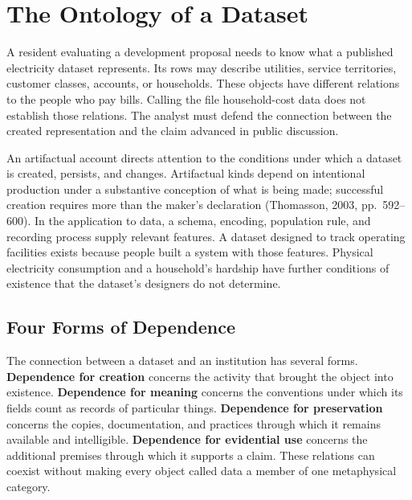 
\hypertarget{M09-the-ontology-of-a-dataset}{%
\section{The Ontology of a
Dataset}\label{M09-the-ontology-of-a-dataset}}

\noindent A resident evaluating a development proposal needs to know what a
published electricity dataset represents. Its rows may describe
utilities, service territories, customer classes, accounts, or
households. These objects have different relations to the people who pay
bills. Calling the file household-cost data does not establish those
relations. The analyst must defend the connection between the created
representation and the claim advanced in public discussion.

An artifactual account directs attention to the conditions under which a
dataset is created, persists, and changes. Artifactual kinds depend on
intentional production under a substantive conception of what is being
made; successful creation requires more than the maker's declaration
(Thomasson, 2003, pp.~592--600). In the application to data, a schema,
encoding, population rule, and recording process supply relevant
features. A dataset designed to track operating facilities exists
because people built a system with those features. Physical electricity
consumption and a household's hardship have further conditions of
existence that the dataset's designers do not determine.

\hypertarget{M09-four-forms-of-dependence}{%
\subsection{Four Forms of
Dependence}\label{M09-four-forms-of-dependence}}

\noindent The connection between a dataset and an institution has several forms.
\textbf{Dependence for creation} concerns the activity that brought the
object into existence. \textbf{Dependence for meaning} concerns the
conventions under which its fields count as records of particular
things. \textbf{Dependence for preservation} concerns the copies,
documentation, and practices through which it remains available and
intelligible. \textbf{Dependence for evidential use} concerns the
additional premises through which it supports a claim. These relations
can coexist without making every object called data a member of one
metaphysical category.

